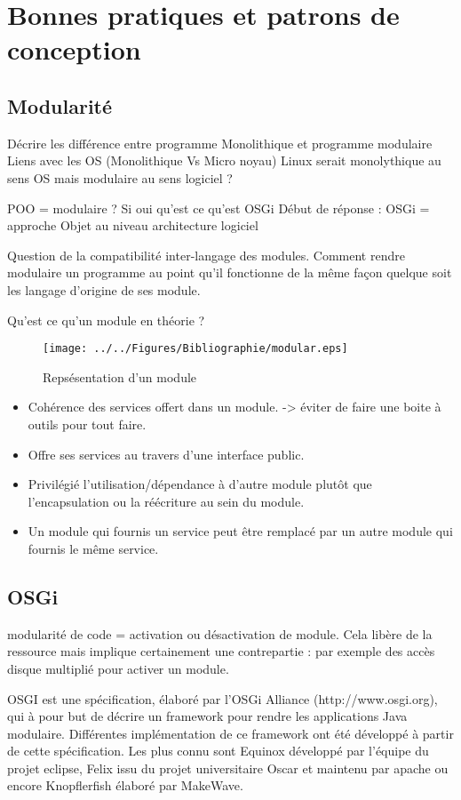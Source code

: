 \documentclass[a4paper, 11pt]{report}
\begin{document}
\section{Bonnes pratiques et patrons de conception}
\subsection{Modularité}
Décrire les différence entre programme Monolithique et programme modulaire
	Liens avec les OS (Monolithique Vs Micro noyau)
	Linux serait monolythique au sens OS mais modulaire au sens logiciel ?

POO = modulaire ?
	Si oui qu’est ce qu’est OSGi
	Début de réponse : OSGi = approche Objet au niveau architecture logiciel

Question de la compatibilité inter-langage des modules. Comment rendre modulaire un programme au point qu’il fonctionne de la même façon quelque soit les langage d’origine de ses module.

Qu’est ce qu’un module en théorie ?
\begin{figure}
	\begin{center}
		\texttt{[image: ../../Figures/Bibliographie/modular.eps]}
		\caption{Repsésentation d'un module}
	\end{center}
\end{figure}

\begin{itemize}
	\item Cohérence des services offert dans un module. -> éviter de faire une boite à outils pour tout faire.
	\item Offre ses services au travers d’une interface public.
	\item Privilégié l’utilisation/dépendance à d’autre module plutôt que l’encapsulation ou la réécriture au sein du module.
	\item Un module qui fournis un service peut être remplacé par un autre module qui fournis le même service.
\end{itemize}
\subsection{OSGi}
modularité de code = activation ou désactivation de module. Cela libère de la ressource mais implique certainement une contrepartie : par exemple des accès disque multiplié pour activer un module.

OSGI est une spécification, élaboré par l’OSGi Alliance (http://www.osgi.org), qui à pour but de décrire un framework pour rendre les applications Java modulaire. Différentes implémentation de ce framework ont été développé à partir de cette spécification. Les plus connu sont Equinox développé par l’équipe du projet eclipse, Felix issu du projet universitaire Oscar et maintenu par apache ou encore Knopflerfish élaboré par MakeWave.
\end{document}
